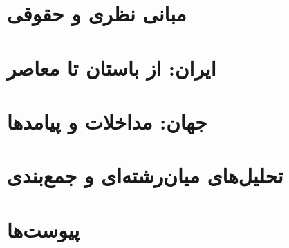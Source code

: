 \documentclass[12pt,a4paper,openright,twoside]{book}
\begin{document}
\frontmatter



\tableofcontents
\listoffigures
\listoftables



\mainmatter

\part{مبانی نظری و حقوقی}
\label{part:theory}




\part{ایران: از باستان تا معاصر}
\label{part:iran}





\part{جهان: مداخلات و پیامدها}
\label{part:world}




\part{تحلیل‌های میان‌رشته‌ای و جمع‌بندی}
\label{part:analysis}





\appendix
\part{پیوست‌ها}
\label{part:appendices}






\backmatter

\end{document}
